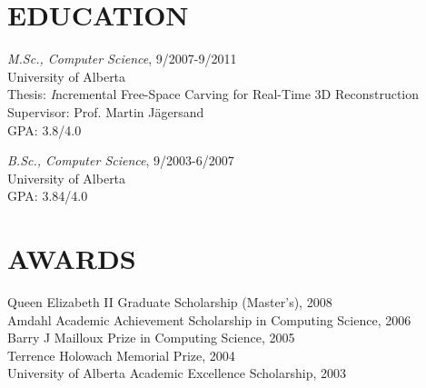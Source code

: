 \documentclass{res}
\begin{document}
\begin{resume}
\section{EDUCATION}
    \vspace*{0.5ex}
    \textit{M.Sc., Computer Science}, 9/2007-9/2011\\
    University of Alberta\\
    \hspace*{2.5em} Thesis: {\textit Incremental Free-Space Carving for Real-Time 3D Reconstruction}\\
    \hspace*{2.5em} Supervisor: Prof. Martin J{\"a}gersand\\
    \hspace*{2.5em} GPA: 3.8/4.0

    \textit{B.Sc., Computer Science}, 9/2003-6/2007\\
    University of Alberta\\
    \hspace*{2.5em} GPA: 3.84/4.0


\section{AWARDS}
    \vspace*{0.5ex}
    Queen Elizabeth II Graduate Scholarship (Master's), 2008\\
    Amdahl Academic Achievement Scholarship in Computing Science, 2006\\
    Barry J Mailloux Prize in Computing Science, 2005\\
    Terrence Holowach Memorial Prize, 2004\\
    University of Alberta Academic Excellence Scholarship, 2003



\end{resume}
\end{document}
